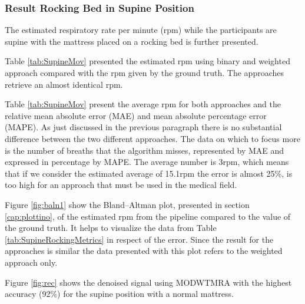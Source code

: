 
\subsubsection{Result Rocking Bed in Supine Position}  %

The estimated respiratory rate per minute (rpm) while the participants are supine with the mattress placed on a rocking bed is further presented. 

Table \ref{tab:SupineMov} presented the estimated rpm using binary and weighted approach compared with the rpm given by the ground truth. The approaches retrieve an almost identical rpm. 

\vspace{0.5cm}


Table \ref{tab:SupineMov} present the average rpm for both approaches  
and the relative mean absolute error (MAE) and mean absolute percentage error (MAPE). As just discussed in the previous paragraph there is no substantial difference between the two different approaches. The data on which to focus more is the number of breaths that the algorithm misses, represented by MAE and expressed in percentage by MAPE. The average number is 3rpm, which means that if we consider the estimated average of 15.1rpm the error is almost 25\%, is too high for an approach that must be used in the medical field.



Figure \ref{fig:baln1} show the Bland–Altman plot, presented in section \ref{cap:plottino}, of the estimated rpm from the pipeline compared to the value of the ground truth. It helps to visualize the data from Table \ref{tab:SupineRockingMetrics} in respect of the error. Since the result for the approaches is similar the data presented with this plot refers to the weighted approach only.

Figure \ref{fig:rec} shows the denoised signal using MODWTMRA with the highest accuracy (92\%) for the supine position with a normal mattress.

